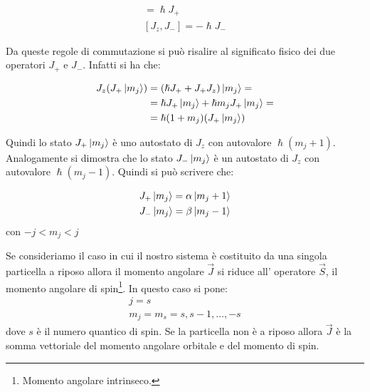 \begin{gather}
[J_z,J_+]=\hslash J_+ \\
[J_z,J_-]=-\hslash J_-
\end{gather}

Da queste regole di commutazione si può risalire al significato fisico dei due
operatori $J_+$ e $J_-$. Infatti si ha che:

\begin{equation}
\begin{split}
J_z(J_+\ket{m_j}) &= (\hslash J_++J_+J_z)\ket{m_j}=\\
& = \hslash J_+\ket{m_j}+\hslash m_j J_+\ket{m_j}=\\
& = \hslash(1+m_j)(J_+\ket{m_j})
\end{split}
\end{equation}

Quindi lo stato $J_+\ket{m_j}$ è uno autostato di $J_z$ con autovalore $\hslash
(m_j+1)$. Analogamente si dimostra che lo stato $J_-\ket{m_j}$ è un autostato di
$J_z$ con autovalore $\hslash(m_j-1)$. Quindi si può scrivere che:

\begin{gather}
J_+\ket{m_j}= \alpha \ket{m_j+1} \\
J_-\ket{m_j}= \beta \ket{m_j-1}
\end{gather}
con $-j<m_j<j$

Se consideriamo il caso in cui il nostro sistema è costituito da una singola
particella a riposo allora il momento angolare $\vec{J}$ si riduce all'
operatore $\vec{S}$, il momento
angolare di spin\footnote{Momento angolare intrinseco. }. In questo caso si
pone:
\begin{gather}
j=s \\
m_j=m_s=s,s-1,\dots,-s
\end{gather}
dove $s$ è il numero quantico di spin. Se la particella non è a riposo allora
$\vec{J}$ è la somma vettoriale del momento angolare orbitale e del momento di
spin.
